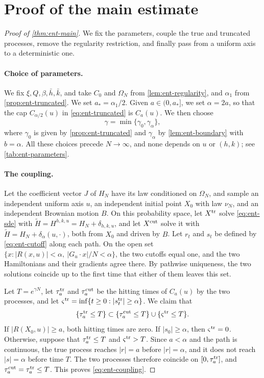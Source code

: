 \section{Proof of the main estimate}\label{sec:ent-proof}

\begin{proof}[Proof of \cref{thm:ent-main}]
We fix the parameters, couple the true and truncated processes, remove the
regularity restriction, and finally pass from a uniform axis to a
deterministic one.

\paragraph{Choice of parameters.}
We fix $\xi,Q,\beta,\bar h,\bar k$, and take $C_0$ and $\Omega_N$ from
\cref{lem:ent-regularity}, and $\alpha_1$ from \cref{prop:ent-truncated}. We
set $a_*=\alpha_1/2$. Given $a\in(0,a_*]$, we set $\alpha=2a$, so that the
cap $C_{\alpha/2}(u)$ in \eqref{eq:ent-truncated} is $C_a(u)$. We then choose
\[
 \gamma=\min\{\gamma_0,\gamma_\alpha\},
\]
where $\gamma_0$ is given by \cref{prop:ent-truncated} and $\gamma_\alpha$
by \cref{lem:ent-boundary} with $b=\alpha$. All these choices precede
$N\to\infty$, and none depends on $u$ or $(h,k)$; see
\cref{tab:ent-parameters}.

\paragraph{The coupling.}
Let the coefficient vector $J$ of $H_N$ have its law conditioned on
$\Omega_N$, and sample an independent uniform axis $u$, an independent
initial point $X_0$ with law $\nu_N$, and an independent Brownian motion
$B$. On this probability space, let $X^{\rm tr}$ solve \eqref{eq:ent-sde}
with $\widetilde H=H^{h,k,u}=H_N+\delta_{h,k,u}$, and let $X^{\rm cut}$ solve
it with $\widetilde H=H_N+\delta_\alpha(u,\cdot)$, both from $X_0$ and driven
by $B$. Let $r_t$ and $s_t$ be defined by \eqref{eq:ent-cutoff} along each
path. On the open set $\{x:|R(x,u)|<\alpha,\ |G_u\cdot x|/N<\alpha\}$, the
two cutoffs equal one, and the two Hamiltonians and their gradients agree
there. By pathwise uniqueness, the two solutions coincide up to the first
time that either of them leaves this set.

Let $T=e^{\gamma N}$, let $\tau_a^{\rm tr}$ and $\tau_a^{\rm cut}$ be the
hitting times of $C_a(u)$ by the two processes, and let
$\varsigma^{\rm tr}=\inf\{t\ge0:|s_t^{\rm tr}|\ge\alpha\}$. We claim that
\begin{equation}\label{eq:ent-coupling}
 \{\tau_a^{\rm tr}\le T\}\subset\{\tau_a^{\rm cut}\le T\}
 \cup\{\varsigma^{\rm tr}\le T\}.
\end{equation}
If $|R(X_0,u)|\ge a$, both hitting times are zero. If $|s_0|\ge\alpha$, then
$\varsigma^{\rm tr}=0$. Otherwise, suppose that $\tau_a^{\rm tr}\le T$ and
$\varsigma^{\rm tr}>T$. Since $a<\alpha$ and the path is continuous, the
true process reaches $|r|=a$ before $|r|=\alpha$, and it does not reach
$|s|=\alpha$ before time $T$. The two processes therefore coincide on
$[0,\tau_a^{\rm tr}]$, and $\tau_a^{\rm cut}=\tau_a^{\rm tr}\le T$. This
proves \eqref{eq:ent-coupling}.


\end{proof}
